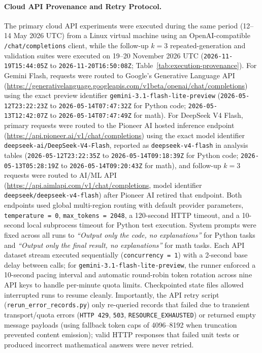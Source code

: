 \documentclass[a4paper,fleqn]{cas-sc}
\begin{document}
\paragraph{Cloud API Provenance and Retry Protocol.}
The primary cloud API experiments were executed during the same period (12--14 May 2026 UTC) from a Linux virtual machine using an OpenAI-compatible \texttt{/chat/completions} client, while the follow-up $k = 3$ repeated-generation and validation suites were executed on 19--20 November 2026 UTC (\texttt{2026-11-19T15:44:05Z} to \texttt{2026-11-20T16:50:08Z}; Table~\ref{tab:execution-provenance}). For Gemini Flash, requests were routed to Google's Generative Language API (\url{https://generativelanguage.googleapis.com/v1beta/openai/chat/completions}) using the exact preview identifier \texttt{gemini-3.1-flash-lite-preview} (\texttt{2026-05-12T23:22:23Z} to \texttt{2026-05-14T07:47:32Z} for Python code; \texttt{2026-05-13T12:42:07Z} to \texttt{2026-05-14T07:47:49Z} for math). For DeepSeek V4 Flash, primary requests were routed to the Pioneer AI hosted inference endpoint (\url{https://api.pioneer.ai/v1/chat/completions}) using the exact model identifier \texttt{deepseek-ai/DeepSeek-V4-Flash}, reported as \texttt{deepseek-v4-flash} in analysis tables (\texttt{2026-05-12T23:22:35Z} to \texttt{2026-05-14T09:18:39Z} for Python code; \texttt{2026-05-13T05:28:19Z} to \texttt{2026-05-14T09:20:43Z} for math), and follow-up $k = 3$ requests were routed to AI/ML API (\url{https://api.aimlapi.com/v1/chat/completions}, model identifier \texttt{deepseek/deepseek-v4-flash}) after Pioneer AI retired that endpoint. Both endpoints used global multi-region routing with default provider parameters, \texttt{temperature = 0}, \texttt{max\_tokens = 2048}, a 120-second HTTP timeout, and a 10-second local subprocess timeout for Python test execution. System prompts were fixed across all runs to \emph{``Output only the code, no explanations''} for Python tasks and \emph{``Output only the final result, no explanations''} for math tasks. Each API dataset stream executed sequentially (\texttt{concurrency = 1}) with a 2-second base delay between calls; for \texttt{gemini-3.1-flash-lite-preview}, the runner enforced a 10-second pacing interval and automatic round-robin token rotation across nine API keys to handle per-minute quota limits. Checkpointed state files allowed interrupted runs to resume cleanly. Importantly, the API retry script (\texttt{rerun\_error\_records.py}) only re-queried records that failed due to transient transport/quota errors (\texttt{HTTP 429}, \texttt{503}, \texttt{RESOURCE\_EXHAUSTED}) or returned empty message payloads (using fallback token caps of 4096--8192 when truncation prevented content emission); valid HTTP responses that failed unit tests or produced incorrect mathematical answers were never retried.
\end{document}
